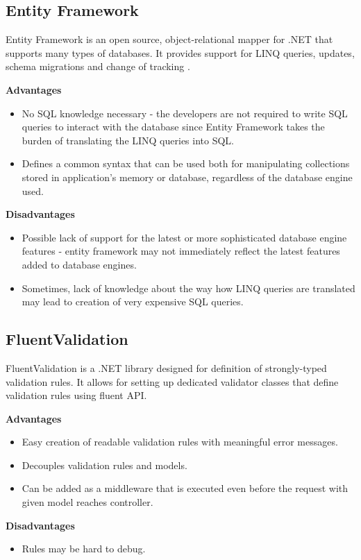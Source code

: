 \subsection{Entity Framework}
Entity Framework\cite{ef} is an open source, object-relational mapper for .NET that supports many types of databases. It provides support for LINQ queries, updates, schema migrations and change of tracking \cite{ef-doc}. 

\textbf{Advantages}
\begin{itemize}
    \item No SQL knowledge necessary - the developers are not required to write SQL queries to interact with the database since Entity Framework takes the burden of translating the LINQ queries into SQL. 
    \item Defines a common syntax that can be used both for manipulating collections stored in application's memory or database, regardless of the database engine used.
\end{itemize}

\textbf{Disadvantages}
\begin{itemize}
    \item Possible lack of support for the latest or more sophisticated database engine features - entity framework may not immediately reflect the latest features added to database engines.
    \item Sometimes, lack of knowledge about the way how LINQ queries are translated may lead to creation of very expensive SQL queries.
\end{itemize}

\subsection{FluentValidation}
FluentValidation\cite{fluentvalidation} is a .NET library designed for definition of strongly-typed validation rules. It allows for setting up dedicated validator classes that define validation rules using fluent API.

\textbf{Advantages}
\begin{itemize}
    \item Easy creation of readable validation rules with meaningful error messages.
    \item Decouples validation rules and models.
    \item Can be added as a middleware that is executed even before the request with given model reaches controller.
\end{itemize}
\textbf{Disadvantages}
\begin{itemize}
    \item Rules may be hard to debug.
\end{itemize}


